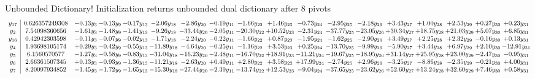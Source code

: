 \documentclass[9pt]{article}
\begin{document}
Unbounded Dictionary!
Initialization returns unbounded dual dictionary after 8 pivots
\[\begin{array}{c| c c@{\hskip 2pt} c@{\hskip 2pt} c@{\hskip 2pt} c@{\hskip 2pt} c@{\hskip 2pt} c@{\hskip 2pt} c@{\hskip 2pt} c@{\hskip 2pt} c@{\hskip 2pt} c@{\hskip 2pt} c@{\hskip 2pt} c@{\hskip 2pt} c@{\hskip 2pt} c@{\hskip 2pt} c@{\hskip 2pt} c@{\hskip 2pt} }
 y_{17}   &  0.626357249308 & -0.13 y_{3} & -0.13 y_{9} & -0.17 y_{13} & -2.06 y_{18} & -2.86 y_{20} & -0.19 y_{11} & -1.66 y_{22} & +  1.46 y_{23} & -0.73 y_{24} & -2.95 y_{25} & -2.18 y_{26} & +  3.43 y_{27} & +  1.00 y_{28} & +  2.53 y_{29} & +  0.27 y_{30} & +  0.23 y_{31}\\
 y_{2}   &  7.54098360656 & -1.61 y_{3} & -1.48 y_{9} & -1.41 y_{13} & -9.26 y_{18} & -33.44 y_{20} & -2.05 y_{11} & -20.30 y_{22} & + 10.52 y_{23} & -2.31 y_{24} & -37.77 y_{25} & -23.05 y_{26} & + 30.34 y_{27} & + 18.75 y_{28} & + 21.03 y_{29} & +  5.07 y_{30} & +  6.85 y_{31}\\
 y_{16}   &  0.42942303598 & -0.11 y_{3} & -0.07 y_{9} & -0.02 y_{13} & -1.71 y_{18} & -2.24 y_{20} & -0.22 y_{11} & -1.66 y_{22} & +  0.87 y_{23} & -1.95 y_{24} & -1.62 y_{25} & -2.90 y_{26} & +  3.49 y_{27} & +  2.25 y_{28} & +  2.32 y_{29} & -0.16 y_{30} & +  0.13 y_{31}\\
 y_{4}   &  1.93698105174 & +  0.29 y_{3} & -0.42 y_{9} & -0.55 y_{13} & -11.89 y_{18} & -4.64 y_{20} & -0.25 y_{11} & -1.16 y_{22} & +  3.53 y_{23} & +  0.25 y_{24} & -13.70 y_{25} & -9.99 y_{26} & -5.90 y_{27} & +  3.44 y_{28} & +  6.97 y_{29} & +  2.10 y_{30} & -12.91 y_{31}\\
 y_{5}   &  6.1560570577 & -1.27 y_{3} & -0.58 y_{9} & -0.83 y_{13} & -31.04 y_{18} & -16.23 y_{20} & -2.48 y_{11} & -16.70 y_{22} & + 18.91 y_{23} & -11.21 y_{24} & -19.67 y_{25} & -18.95 y_{26} & + 31.14 y_{27} & + 25.95 y_{28} & + 23.00 y_{29} & -2.47 y_{30} & -0.95 y_{31}\\
 y_{6}   &  2.66361507345 & +  0.13 y_{3} & -0.93 y_{9} & -1.36 y_{13} & -11.21 y_{18} & -2.63 y_{20} & +  0.49 y_{11} & +  2.80 y_{22} & +  3.58 y_{23} & + 17.99 y_{24} & -2.74 y_{25} & +  2.96 y_{26} & -3.25 y_{27} & -8.86 y_{28} & -2.35 y_{29} & -0.21 y_{30} & +  4.00 y_{31}\\
 y_{7}   &  8.20097934852 & -1.45 y_{3} & -1.72 y_{9} & -1.65 y_{13} & -15.30 y_{18} & -27.44 y_{20} & -2.39 y_{11} & -13.74 y_{22} & + 12.53 y_{23} & -9.04 y_{24} & -37.65 y_{25} & -23.62 y_{26} & + 52.60 y_{27} & + 13.24 y_{28} & + 32.60 y_{29} & +  7.46 y_{30} & +  0.58 y_{31}\\

\end{array}\]
\end{document}
